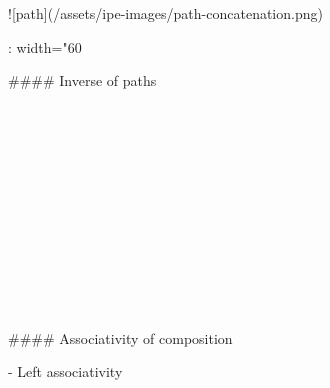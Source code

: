 ![path](/assets/ipe-images/path-concatenation.png){: width="60%

#### Inverse of paths

\begin{code}%
\>[0]\<%
\\
\>[0][@{}l@{\AgdaIndent{0}}]%
\>[2]\AgdaSymbol{:}\AgdaSpace{}%
\AgdaSpace{}%
\AgdaSymbol{\{}\AgdaSymbol{\}}\AgdaSpace{}%
\AgdaSymbol{\{}\AgdaSpace{}%
\AgdaSymbol{:}\AgdaSpace{}%
\AgdaSpace{}%
\AgdaSymbol{\}}\AgdaSpace{}%
\AgdaSymbol{\{}\AgdaSpace{}%
\AgdaSpace{}%
\AgdaSymbol{:}\AgdaSpace{}%
\AgdaSymbol{\}}\<%
\\
%
\>[2]\AgdaSpace{}%
\AgdaSpace{}%
\AgdaOperator{\AgdaDatatype{==}}\AgdaSpace{}%
\<%
\\
%
\>[2]\AgdaComment{--------}\<%
\\
%
\>[2]\AgdaSpace{}%
\AgdaSpace{}%
\AgdaOperator{\AgdaDatatype{==}}\AgdaSpace{}%
\<%
\\
%
\\[\AgdaEmptyExtraSkip]%
\>[0]\AgdaSpace{}%
\AgdaSpace{}%
\AgdaSymbol{=}\AgdaSpace{}%
\<%
\end{code}

\begin{code}%
\>[0]\<%
\\
\>[0]\AgdaSpace{}%
\AgdaSymbol{=}\AgdaSpace{}%
\<%
\\
\>[0]\AgdaOperator{\AgdaFunction{!\AgdaUnderscore{}}}%
\>[4]\AgdaSymbol{=}\AgdaSpace{}%
\<%
\\
%
\\[\AgdaEmptyExtraSkip]%
\>[0]\AgdaSpace{}%
\AgdaSpace{}%
\AgdaSpace{}%
\AgdaOperator{\AgdaFunction{!\AgdaUnderscore{}}}\<%
\end{code}

#### Associativity of composition

- Left associativity

}

